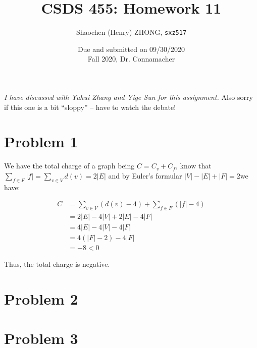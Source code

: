 \documentclass[11pt]{article}
\newcommand{\ilc}{\texttt}
\begin{document}
\title{\textbf{CSDS 455: Homework 11}}

\author{Shaochen (Henry) ZHONG, \ilc{sxz517}}
\date{Due and submitted on 09/30/2020 \\ Fall 2020, Dr. Connamacher}
\maketitle

\textit{I have discussed with Yuhui Zhang and Yige Sun for this assignment.} Also sorry if this one is a bit ``sloppy'' -- have to watch the debate!

\section*{Problem 1}

We have the total charge of a graph being $C = C_v + C_f$, know that $\sum_{f \in F}|f| = \sum_{v \in V} d(v) = 2|E|$ and by Euler's formular $|V| - |E| + |F| = 2$we have:

\begin{align*}
    C &= \sum_{v \in V}(d(v) - 4) + \sum_{f \in F}(|f| - 4) \\
    &= 2|E| - 4|V| + 2|E| - 4|F| \\
    &= 4|E| - 4|V| - 4|F| \\
    &= 4(|F| - 2) - 4|F| \\
    &= -8 < 0
\end{align*}

Thus, the total charge is negative.





\section*{Problem 2}

\section*{Problem 3}



%
% 
% 
\end{document}
